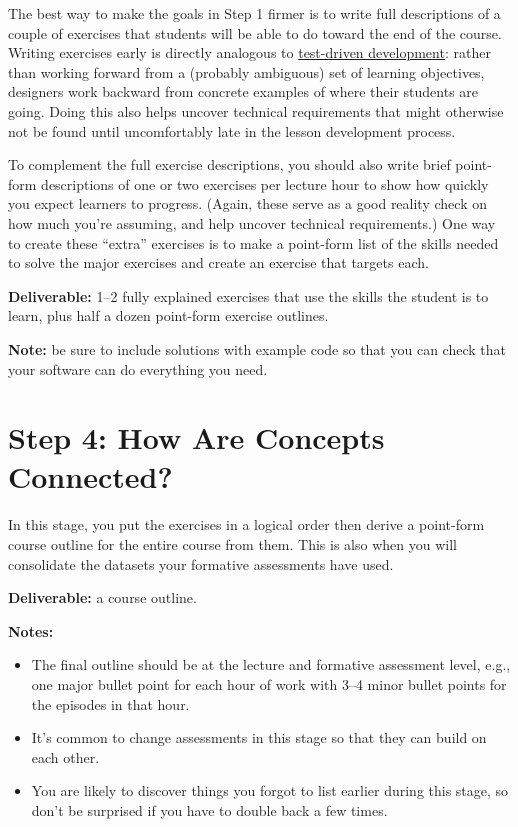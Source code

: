 The best way to make the goals in Step 1 firmer is to write full
descriptions of a couple of exercises that students will be able to do
toward the end of the course. Writing exercises early is directly
analogous to \href{https://en.wikipedia.org/wiki/Test-driven_development}{test-driven development}: rather than working
forward from a (probably ambiguous) set of learning objectives,
designers work backward from concrete examples of where their students
are going. Doing this also helps uncover technical requirements that
might otherwise not be found until uncomfortably late in the lesson
development process.

To complement the full exercise descriptions, you should also write
brief point-form descriptions of one or two exercises per lecture hour
to show how quickly you expect learners to progress. (Again, these serve
as a good reality check on how much you're assuming, and help uncover
technical requirements.) One way to create these ``extra'' exercises is to
make a point-form list of the skills needed to solve the major exercises
and create an exercise that targets each.

\textbf{Deliverable:} 1--2 fully explained exercises that use the skills the
student is to learn, plus half a dozen point-form exercise outlines.

\textbf{Note:} be sure to include solutions with example code so that you can
check that your software can do everything you need.

\section{Step 4: How Are Concepts Connected?}\label{step-4-how-are-concepts-connected}

In this stage, you put the exercises in a logical order then derive a
point-form course outline for the entire course from them. This is also
when you will consolidate the datasets your formative assessments have
used.

\textbf{Deliverable:} a course outline.

\textbf{Notes:}

\begin{itemize}
\item
  The final outline should be at the lecture and formative assessment
  level, e.g., one major bullet point for each hour of work with 3--4
  minor bullet points for the episodes in that hour.
\item
  It's common to change assessments in this stage so that they can
  build on each other.
\item
  You are likely to discover things you forgot to list earlier during
  this stage, so don't be surprised if you have to double back a few
  times.
\end{itemize}

